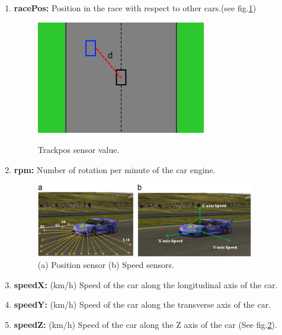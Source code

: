 \documentclass{llncs}
\begin{document}
\begin{enumerate}
	\item \textbf{racePos:} Position in the race with respect to other cars.(see fig.\ref{fig})
	\begin{figure}[h!]
		
		\centering
		\includegraphics[width=0.7\textwidth]{fig/opendist.PNG}
		\label{fig}
		\begin{minipage}{10cm}
			\centering
			\caption{\footnotesize Trackpos sensor value.}
		\end{minipage} 
	\end{figure}
	\item \textbf{rpm:}  Number of rotation per minute of the car engine.
	\begin{figure}[h!]
		
		\centering
		\includegraphics[width=0.9\textwidth]{fig/CARSEN.PNG}
		\begin{minipage}{10cm}
			\centering
			\caption{\footnotesize (a) Position sensor (b) Speed sensors.}
			\label{14}
		\end{minipage} 
	\end{figure}
	\newpage
	
	\item \textbf{speedX:} (km/h) Speed of the car along the longitudinal axis of the car.
	\item \textbf{speedY:} (km/h) Speed of the car along the transverse axis of the car.
	\item \textbf{speedZ:}  (km/h) Speed of the car along the Z axis of the car (See fig.\ref{14}).
	

\end{enumerate}
\end{document}
